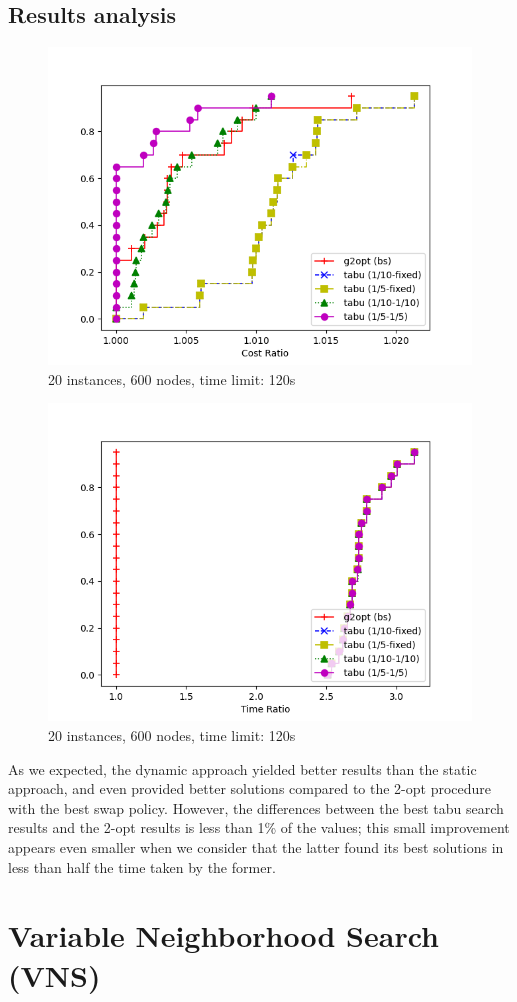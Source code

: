 \subsection{Results analysis}

\begin{figure}[h]
    \centering
    \includegraphics*[width=.6\textwidth]{../plots/perfprof_tabu_costs.png}
    \caption*{20 instances, 600 nodes, time limit: 120s}
\end{figure}
\FloatBarrier
\begin{figure}[h]
    \centering
    \includegraphics*[width=.6\textwidth]{../plots/perfprof_tabu_times.png}
    \caption*{20 instances, 600 nodes, time limit: 120s}
\end{figure}
\FloatBarrier

As we expected, the dynamic approach yielded better results than the static approach, and even provided better solutions compared to the 2-opt procedure with the best swap policy. However, the differences between the best tabu search results and the 2-opt results is less than 1\% of the values; this small improvement appears even smaller when we consider that the latter found its best solutions in less than half the time taken by the former.

\section{Variable Neighborhood Search (VNS)}

